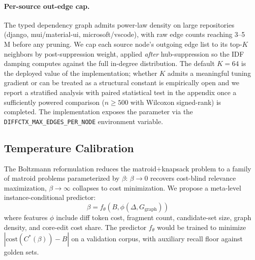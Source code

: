 \documentclass[11pt, a4paper]{article}
\begin{document}
\paragraph{Per-source out-edge cap.} The typed dependency graph admits power-law density on large repositories (django, mui/material-ui, microsoft/vscode), with raw edge counts reaching 3--5\,M before any pruning. We cap each source node's outgoing edge list to its top-$K$ neighbors by post-suppression weight, applied \emph{after} hub-suppression so the IDF damping computes against the full in-degree distribution. The default $K{=}64$ is the deployed value of the implementation; whether $K$ admits a meaningful tuning gradient or can be treated as a structural constant is empirically open and we report a stratified analysis with paired statistical test in the appendix once a sufficiently powered comparison ($n{\geq}500$ with Wilcoxon signed-rank) is completed. The implementation exposes the parameter via the \texttt{DIFFCTX\_MAX\_EDGES\_PER\_NODE} environment variable.

\subsection{Temperature Calibration}
\label{sec:beta-calibration}

The Boltzmann reformulation reduces the matroid+knapsack problem to a family of matroid problems parameterized by $\beta$: $\beta \to 0$ recovers cost-blind relevance maximization, $\beta \to \infty$ collapses to cost minimization. We propose a meta-level instance-conditional predictor:
\begin{equation}
\beta = f_\theta(B, \phi(\Delta, G_{\mathrm{graph}}))
\end{equation}
where features $\phi$ include diff token cost, fragment count, candidate-set size, graph density, and core-edit cost share. The predictor $f_\theta$ would be trained to minimize $|\mathrm{cost}(C^*(\beta)) - B|$ on a validation corpus, with auxiliary recall floor against golden sets.
\end{document}
